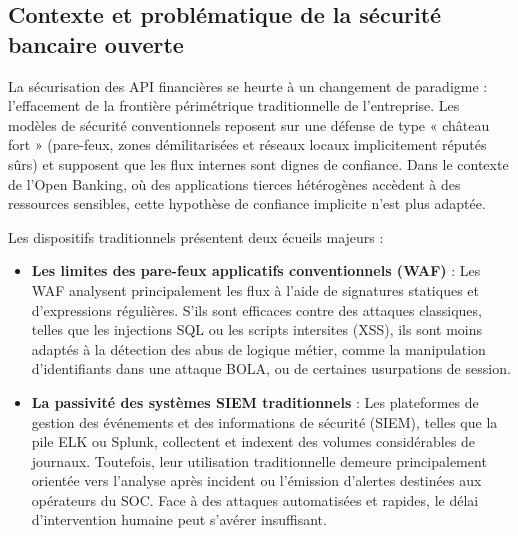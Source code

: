 \subsection{Contexte et problématique de la sécurité bancaire ouverte}
La sécurisation des API financières se heurte à un changement de paradigme : l'effacement de la frontière périmétrique traditionnelle de l'entreprise. Les modèles de sécurité conventionnels reposent sur une défense de type « château fort » (pare-feux, zones démilitarisées et réseaux locaux implicitement réputés sûrs) et supposent que les flux internes sont dignes de confiance. Dans le contexte de l'Open Banking, où des applications tierces hétérogènes accèdent à des ressources sensibles, cette hypothèse de confiance implicite n'est plus adaptée.

Les dispositifs traditionnels présentent deux écueils majeurs :
\begin{itemize}[leftmargin=*]
    \item \textbf{Les limites des pare-feux applicatifs conventionnels (WAF)} : Les WAF analysent principalement les flux à l'aide de signatures statiques et d'expressions régulières. S'ils sont efficaces contre des attaques classiques, telles que les injections SQL ou les scripts intersites (XSS), ils sont moins adaptés à la détection des abus de logique métier, comme la manipulation d'identifiants dans une attaque BOLA, ou de certaines usurpations de session.
    \item \textbf{La passivité des systèmes SIEM traditionnels} : Les plateformes de gestion des événements et des informations de sécurité (SIEM), telles que la pile ELK ou Splunk, collectent et indexent des volumes considérables de journaux. Toutefois, leur utilisation traditionnelle demeure principalement orientée vers l'analyse après incident ou l'émission d'alertes destinées aux opérateurs du SOC. Face à des attaques automatisées et rapides, le délai d'intervention humaine peut s'avérer insuffisant.
\end{itemize}


